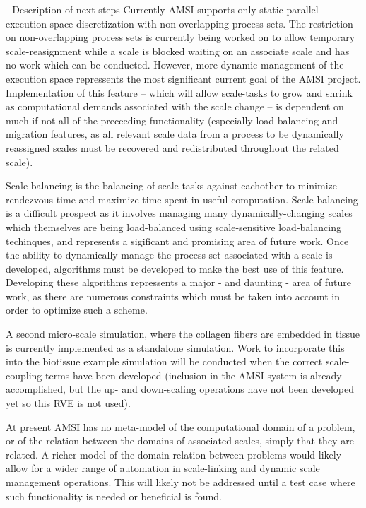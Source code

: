 - Description of next steps
\label{future-work}
Currently AMSI supports only static parallel execution space discretization with non-overlapping process sets. The restriction on non-overlapping process sets is currently being worked on to allow temporary scale-reasignment while a scale is blocked waiting on an associate scale and has no work which can be conducted. However, more dynamic management of the execution space repressents the most significant current goal of the AMSI project. Implementation of this feature -- which will allow scale-tasks to grow and shrink as computational demands associated with the scale change -- is dependent on much if not all of the preceeding functionality (especially load balancing and migration features, as all relevant scale data from a process to be dynamically reassigned scales must be recovered and redistributed throughout the related scale).

Scale-balancing is the balancing of scale-tasks against eachother to minimize rendezvous time and maximize time spent in useful computation. Scale-balancing is a difficult prospect as it involves managing many dynamically-changing scales which themselves are being load-balanced using scale-sensitive load-balancing techinques, and represents a sigificant and promising area of future work. Once the ability to dynamically manage the process set associated with a scale is developed, algorithms must be developed to make the best use of this feature. Developing these algorithms repressents a major - and daunting - area of future work, as there are numerous constraints which must be taken into account in order to optimize such a scheme.

A second micro-scale simulation, where the collagen fibers are embedded in tissue is currently implemented as a standalone simulation. Work to incorporate this into the biotissue example simulation will be conducted when the correct scale-coupling terms have been developed (inclusion in the AMSI system is already accomplished, but the up- and down-scaling operations have not been developed yet so this RVE is not used). \cite{} \cite{} \cite{}

At present AMSI has no meta-model of the computational domain of a problem, or of the relation between the domains of associated scales, simply that they are related. A richer model of the domain relation between problems would likely allow for a wider range of automation in scale-linking and dynamic scale management operations. This will likely not be addressed until a test case where such functionality is needed or beneficial is found.

